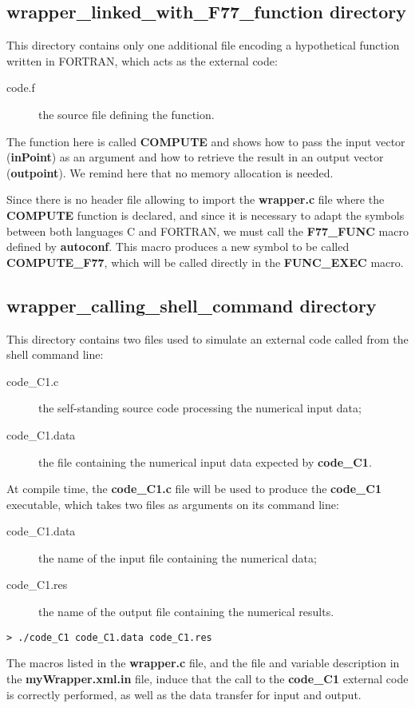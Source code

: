 \subsection{wrapper\_linked\_with\_F77\_function directory}

This directory contains only one additional file encoding a hypothetical function written in FORTRAN, which acts as the external code:
\begin{description}
\item[code.f] the source file defining the function.
\end{description}

The function here is called {\bf COMPUTE} and shows how to pass the input vector ({\bf inPoint}) as an argument and how to retrieve the result in an output vector ({\bf outpoint}). We remind here that no memory allocation is needed.

Since there is no header file allowing to import the {\bf wrapper.c} file where the {\bf COMPUTE} function is declared, and since it is necessary to adapt the symbols between both languages C and FORTRAN, we must call the {\bf F77\_FUNC} macro defined by {\bf autoconf}. This macro produces a new symbol to be called {\bf COMPUTE\_F77}, which will be called directly in the {\bf FUNC\_EXEC} macro.

\subsection{wrapper\_calling\_shell\_command directory}

This directory contains two files used to simulate an external code called from the shell command line:
\begin{description}
\item[code\_C1.c] the self-standing source code processing the numerical input data;
\item[code\_C1.data] the file containing the numerical input data expected by {\bf code\_C1}.
\end{description}

At compile time, the {\bf code\_C1.c} file will be used to produce the {\bf code\_C1} executable, which takes two files as arguments on its command line:
\begin{description}
\item[code\_C1.data] the name of the input file containing the numerical data;
\item[code\_C1.res] the name of the output file containing the numerical results.
\end{description}

\lstset{language=Bash, basicstyle=\normalsize}
\begin{lstlisting}[frame=TBRL]
  > ./code_C1 code_C1.data code_C1.res
\end{lstlisting}

The macros listed in the {\bf wrapper.c} file, and the file and variable description in the {\bf myWrapper.xml.in} file, induce that the call to the {\bf code\_C1} external code is correctly performed, as well as the data transfer for input and output.
